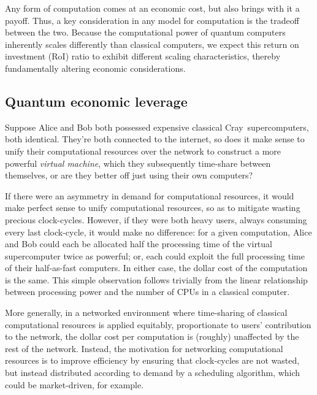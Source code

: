 \documentclass[aps,rmp,twocolumn,amsmath,amssymb,nofootinbib,superscriptaddress,longbibliography,floatfix,table-of-contents,eqsecnum]{revtex4-1}
\newcommand{\comment}[1]{{\color{blue}{\textbf{#1}}}}
\begin{document}
Any form of computation comes at an economic cost, but also brings with it a payoff. Thus, a key consideration in any model for computation is the tradeoff between the two. Because the computational power of quantum computers inherently scales differently than classical computers, we expect this return on investment (RoI) ratio to exhibit different scaling characteristics, thereby fundamentally altering economic considerations.

\comment{To do!}

%
%

\subsection{Quantum economic leverage} 

Suppose Alice and Bob both possessed expensive classical Cray\texttrademark\, supercomputers, both identical. They're both connected to the internet, so does it make sense to unify their computational resources over the network to construct a more powerful \textit{virtual machine}, which they subsequently time-share between themselves, or are they better off just using their own computers?

If there were an asymmetry in demand for computational resources, it would make perfect sense to unify computational resources, so as to mitigate wasting precious clock-cycles. However, if they were both heavy users, always consuming every last clock-cycle, it would make no difference: for a given computation, Alice and Bob could each be allocated half the processing time of the virtual supercomputer twice as powerful; or, each could exploit the full processing time of their half-as-fast computers. In either case, the dollar cost of the computation is the same. This simple observation follows trivially from the linear relationship between processing power and the number of CPUs in a classical computer.

More generally, in a networked environment where time-sharing of classical computational resources is applied equitably, proportionate to users' contribution to the network, the dollar cost per computation is (roughly) unaffected by the rest of the network. Instead, the motivation for networking computational resources is to improve efficiency by ensuring that clock-cycles are not wasted, but instead distributed according to demand by a scheduling algorithm, which could be market-driven, for example.
\end{document}

